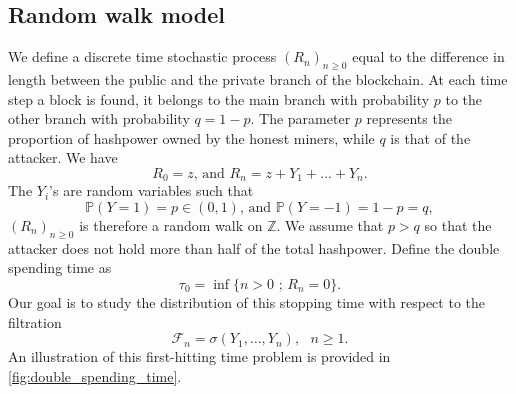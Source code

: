 \subsection{Random walk model}\label{ssec:double_spending_rw}
We define a discrete time stochastic process $(R_n)_{n\geq0}$ equal to the difference in length between the public and the private branch of the blockchain. At each time step a block is found, it belongs to the main branch with probability $p$ to the other branch with probability $q=1-p$. The parameter $p$ represents the proportion of hashpower owned by the honest miners, while $q$ is that of the attacker. We have
$$
R_0 = z\text{, and  }R_n = z+Y_1+\ldots+ Y_n.
$$
The $Y_i$'s are \iid random variables such that 
$$
\mathbb{P}(Y=1) = p\in (0,1)\text{, and }\mathbb{P}(Y=-1) = 1-p=q,
$$ 
$(R_n)_{n\geq0}$ is therefore a random walk on $\mathbb{Z}$. We assume that $p>q$ so that the attacker does not hold more than half of the total hashpower. Define the double spending time as 
$$
{\tau_0} = \inf\{n>0\text{ ; }R_n = 0\}.
$$
Our goal is to study the distribution of this stopping time with respect to the filtration 
$$
\mathcal{F}_n = \sigma(Y_1,\ldots, Y_n),\text{ }n\geq1.
$$ 
An illustration of this first-hitting time problem is provided in \cref{fig:double_spending_time}.
